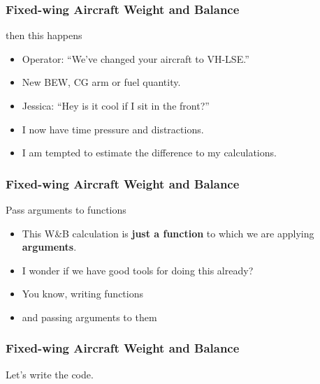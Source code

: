 \begin{frame}
\frametitle{Fixed-wing Aircraft Weight and Balance}
\begin{block}{then this happens}
\begin{itemize}
\item<1-> Operator: ``We've changed your aircraft to VH-LSE.''
\item<2-> New BEW, CG arm or fuel quantity.
\item<3-> Jessica: ``Hey is it cool if I sit in the front?''
\item<4-> I now have time pressure and distractions.
\item<5-> I am tempted to estimate the difference to my calculations.
\end{itemize}
\end{block}
\end{frame}

\begin{frame}
\frametitle{Fixed-wing Aircraft Weight and Balance}
\begin{block}{Pass arguments to functions}
\begin{itemize}
\item<1-> This W\&B calculation is \textbf{just a function} to which we are applying \textbf{arguments}.
\item<2-> I wonder if we have good tools for doing this already?
\item<3-> You know, writing functions
\item<4-> and passing arguments to them
\end{itemize}
\end{block}
\end{frame}

\begin{frame}
\frametitle{Fixed-wing Aircraft Weight and Balance}
\begin{center}
Let's write the code.
\end{center}
\end{frame}

